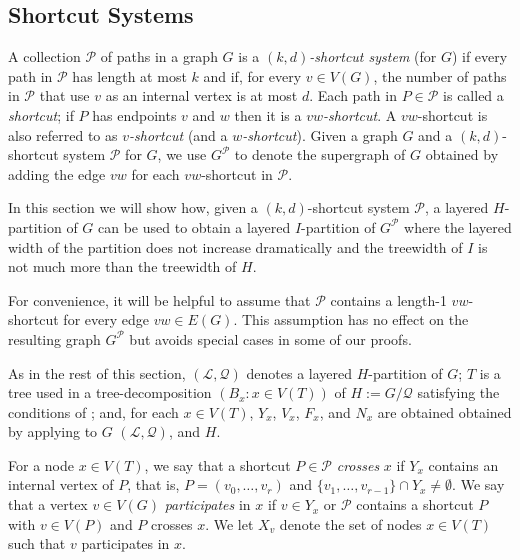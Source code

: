 \documentclass{patmorin}
\begin{document}
\subsection{Shortcut Systems}


A collection $\mathcal{P}$ of paths in a graph $G$ is a \emph{$(k,d)$-shortcut system} (for $G$) if every path in $\mathcal{P}$ has length at most $k$ and if, for every $v\in V(G)$, the number of paths in $\mathcal{P}$ that use $v$ as an internal vertex is at most $d$. Each path in $P\in\mathcal{P}$ is called a \emph{shortcut}; if $P$ has endpoints $v$ and $w$ then it is a \emph{$vw$-shortcut}.  A $vw$-shortcut is also referred to as \emph{$v$-shortcut} (and a \emph{$w$-shortcut}). Given a graph $G$ and a $(k,d)$-shortcut system $\mathcal{P}$ for $G$, we use $G^{\mathcal{P}}$ to denote the supergraph of $G$ obtained by adding the edge $vw$ for each $vw$-shortcut in $\mathcal{P}$.

In this section we will show how, given a $(k,d)$-shortcut system $\mathcal{P}$, a layered $H$-partition of $G$ can be used to obtain a layered $I$-partition of $G^{\mathcal{P}}$ where the layered width of the partition does not increase dramatically and the treewidth of $I$ is not much more than the treewidth of $H$.  

For convenience, it will be helpful to assume that $\mathcal{P}$ contains a
length-1 $vw$-shortcut for every edge $vw\in E(G)$.  This assumption has no effect on the resulting graph $G^{\mathcal{P}}$ but avoids special cases in some of our proofs.

As in the rest of this section, $(\mathcal{L},\mathcal{Q})$ denotes a layered $H$-partition of $G$; $T$ is a tree used in a tree-decomposition $(B_x:x\in V(T))$ of $H:=G/\mathcal{Q}$ satisfying the conditions of ; and, for each $x\in V(T)$, $Y_x$, $V_x$, $F_x$, and $N_x$ are obtained obtained by applying  to $G$ $(\mathcal{L},\mathcal{Q})$, and $H$.

For a node $x\in V(T)$, we say that a shortcut $P\in\mathcal{P}$ \emph{crosses} $x$ if $Y_x$ contains an internal vertex of $P$, that is, $P=(v_0,\ldots,v_r)$ and $\{v_1,\ldots,v_{r-1}\}\cap Y_x\neq\emptyset$.  We say that a vertex $v\in V(G)$ \emph{participates} in $x$ if $v\in Y_x$ or $\mathcal{P}$ contains a shortcut $P$ with $v\in V(P)$ and $P$ crosses $x$. We let $X_v$ denote the set of nodes $x\in V(T)$ such that $v$ participates in $x$.
\end{document}
